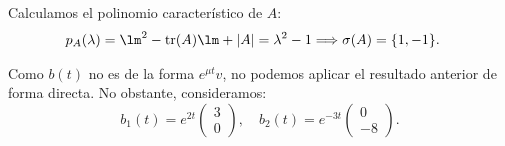 \begin{ejercicio}
    Calculamos el polinomio característico de $A$:
    \begin{align*}
        p_A(\lambda) &= \lm^2 - \operatorname{tr}(A)\lm + |A|
        = \lambda^2 -1
        \Longrightarrow
        \sigma(A) = \{1, -1\}.
    \end{align*}

    Como $b(t)$ no es de la forma $e^{\mu t}v$, no podemos aplicar el resultado anterior de forma directa. No obstante, consideramos:
    \begin{equation*}
        b_1(t) = e^{2t}\begin{pmatrix}
            3\\
            0
        \end{pmatrix},\quad
        b_2(t) = e^{-3t}\begin{pmatrix}
            0\\
            -8
        \end{pmatrix}.
    \end{equation*}


\end{ejercicio}
